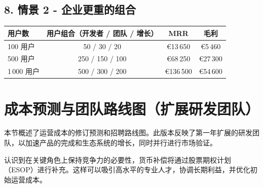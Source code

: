 \documentclass[11pt, a4paper, oneside]{article}
\begin{document}
\subsection*{8. 情景 2 - 企业更重的组合}
\begin{center}
\begin{tabular}{@{}lccc@{}}
\toprule
\textbf{用户数} & \textbf{用户组合}（开发者 / 团队 / 增长） & \textbf{MRR} & \textbf{毛利} \\
\midrule
100 用户   & 50 / 30 / 20   & €13\,650  & €5\,460  \\
500 用户   & 250 / 150 / 100 & €68\,250  & €27\,300 \\
1\,000 用户 & 500 / 300 / 200 & €136\,500 & €54\,600 \\
\bottomrule
\end{tabular}
\end{center}

\section*{成本预测与团队路线图（扩展研发团队）}
本节概述了运营成本的修订预测和招聘路线图。此版本反映了第一年扩展的研发团队，以加速产品的完成和生态系统的增长，同时并行进行市场验证。

认识到在关键角色上保持竞争力的必要性，货币补偿将通过股票期权计划（ESOP）进行补充。这样可以吸引高水平的专业人才，协调长期利益，并优化初始运营成本。
\end{document}
